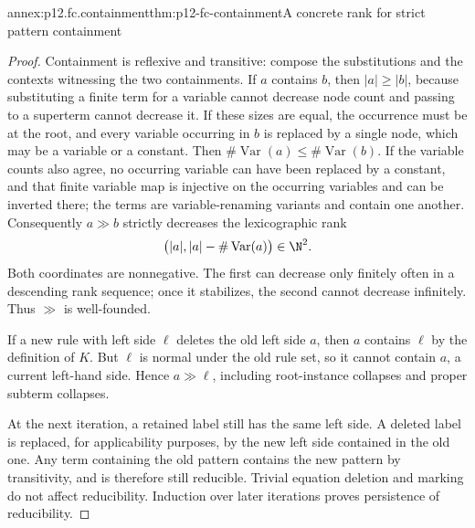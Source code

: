 \begin{annexitem}{annex:p12.fc.containment}{thm:p12-fc-containment}{A concrete rank for strict pattern containment}
\begin{proof}
Containment is reflexive and transitive: compose the substitutions
and the contexts witnessing the two containments. If \(a\)
contains \(b\), then \(\lvert a\rvert\geq\lvert b\rvert\),
because substituting a finite term for a variable cannot decrease
node count and passing to a superterm cannot decrease it.
If these sizes are equal, the occurrence must be at the root, and
every variable occurring in \(b\) is replaced by a single node,
which may be a variable or a constant.
Then \(\#\operatorname{Var}(a)\leq\#\operatorname{Var}(b)\).
If the variable counts also agree, no occurring variable can have
been replaced by a constant, and that finite variable map is
injective on the occurring variables and can be inverted there;
the terms are variable-renaming variants and contain one another.
Consequently \(a\gg b\) strictly decreases the lexicographic rank
\[
 \bigl(\lvert a\rvert,
       \lvert a\rvert-\#\operatorname{Var}(a)\bigr)
 \in\N^2.
\]
Both coordinates are nonnegative. The first can decrease only
finitely often in a descending rank sequence; once it stabilizes,
the second cannot decrease infinitely. Thus \(\gg\) is well-founded.

If a new rule with left side \(\ell\) deletes the old left
side \(a\), then \(a\) contains \(\ell\) by the definition
of \(K\). But \(\ell\) is normal under the old rule set,
so it cannot contain \(a\), a current left-hand side. Hence
\(a\gg\ell\), including root-instance collapses and proper
subterm collapses.

At the next iteration, a retained label still has the same left
side. A deleted label is replaced, for applicability purposes, by
the new left side contained in the old one. Any term containing
the old pattern contains the new pattern by transitivity, and is
therefore still reducible. Trivial equation deletion and marking
do not affect reducibility. Induction over later iterations proves
persistence of reducibility.
\end{proof}
\end{annexitem}

